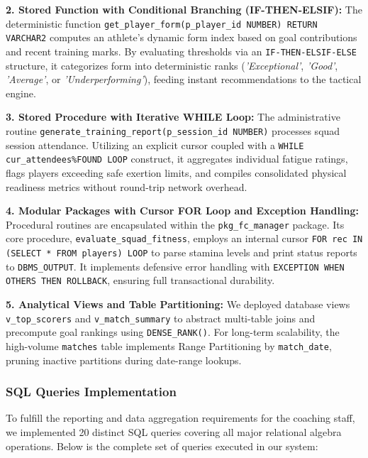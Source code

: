 \documentclass[fonts]{icst}
\begin{document}
\textbf{2. Stored Function with Conditional Branching (IF-THEN-ELSIF):}
The deterministic function \texttt{get\_player\_form(p\_player\_id NUMBER) RETURN VARCHAR2} computes an athlete's dynamic form index based on goal contributions and recent training marks. By evaluating thresholds via an \texttt{IF-THEN-ELSIF-ELSE} structure, it categorizes form into deterministic ranks (\textit{'Exceptional'}, \textit{'Good'}, \textit{'Average'}, or \textit{'Underperforming'}), feeding instant recommendations to the tactical engine.

\textbf{3. Stored Procedure with Iterative WHILE Loop:}
The administrative routine \texttt{generate\_training\_report(p\_session\_id NUMBER)} processes squad session attendance. Utilizing an explicit cursor coupled with a \texttt{WHILE cur\_attendees\%FOUND LOOP} construct, it aggregates individual fatigue ratings, flags players exceeding safe exertion limits, and compiles consolidated physical readiness metrics without round-trip network overhead.

\textbf{4. Modular Packages with Cursor FOR Loop and Exception Handling:}
Procedural routines are encapsulated within the \texttt{pkg\_fc\_manager} package. Its core procedure, \texttt{evaluate\_squad\_fitness}, employs an internal cursor \texttt{FOR rec IN (SELECT * FROM players) LOOP} to parse stamina levels and print status reports to \texttt{DBMS\_OUTPUT}. It implements defensive error handling with \texttt{EXCEPTION WHEN OTHERS THEN ROLLBACK}, ensuring full transactional durability.

\textbf{5. Analytical Views and Table Partitioning:}
We deployed database views \texttt{v\_top\_scorers} and \texttt{v\_match\_summary} to abstract multi-table joins and precompute goal rankings using \texttt{DENSE\_RANK()}. For long-term scalability, the high-volume \texttt{matches} table implements Range Partitioning by \texttt{match\_date}, pruning inactive partitions during date-range lookups.

\subsubsection{SQL Queries Implementation}
To fulfill the reporting and data aggregation requirements for the coaching staff, we implemented 20 distinct SQL queries covering all major relational algebra operations. Below is the complete set of queries executed in our system:
\end{document}
